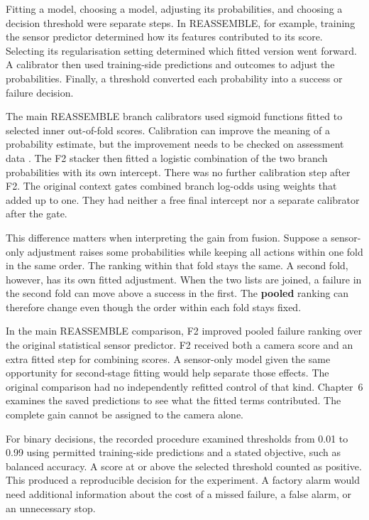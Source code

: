 Fitting a model, choosing a model, adjusting its probabilities, and choosing a decision
threshold were separate steps. In REASSEMBLE, for example, training the sensor predictor
determined how its features contributed to its score. Selecting its regularisation
setting determined which fitted version went forward. A calibrator then used
training-side predictions and outcomes to adjust the probabilities. Finally, a threshold
converted each probability into a success or failure decision.

The main REASSEMBLE branch calibrators used sigmoid functions fitted to selected inner
out-of-fold scores. Calibration can improve the meaning of a probability estimate, but
the improvement needs to be checked on assessment data \parencite{Guo2017Calibration}.
The F2 stacker then fitted a logistic combination of the two branch probabilities with
its own intercept. There was no further calibration step after F2. The original context
gates combined branch log-odds using weights that added up to one. They had neither a
free final intercept nor a separate calibrator after the gate.

This difference matters when interpreting the gain from fusion. Suppose a sensor-only
adjustment raises some probabilities while keeping all actions within one fold in the
same order. The ranking within that fold stays the same. A second fold, however, has its
own fitted adjustment. When the two lists are joined, a failure in the second fold can
move above a success in the first. The \textbf{pooled} ranking can therefore change even
though the order within each fold stays fixed.

In the main REASSEMBLE comparison, F2 improved pooled failure ranking over the original
statistical sensor predictor. F2 received both a camera score and an extra fitted step
for combining scores. A sensor-only model given the same opportunity for second-stage
fitting would help separate those effects. The original comparison had no independently
refitted control of that kind. Chapter~6 examines the saved predictions to see what the
fitted terms contributed. The complete gain cannot be assigned to the camera alone.

For binary decisions, the recorded procedure examined thresholds from 0.01 to 0.99 using
permitted training-side predictions and a stated objective, such as balanced accuracy. A
score at or above the selected threshold counted as positive. This produced a
reproducible decision for the experiment. A factory alarm would need additional
information about the cost of a missed failure, a false alarm, or an unnecessary stop.

